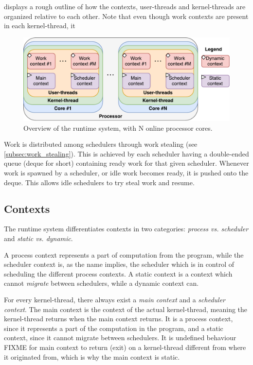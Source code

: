 displays a rough outline of how the contexts, user\hyp{}threads and kernel\hyp{}threads are organized relative to each other. Note that even though work contexts are present in each kernel\hyp{}thread, it 

\begin{figure}[h!]
    \centering
    \includegraphics[width=0.8\linewidth]{fig/runtime_overview}
    \caption{Overview of the runtime system, with N online processor cores.}
    \label{fig:runtime_overview}
\end{figure}

Work is distributed among schedulers through work stealing (see \cref{subsec:work_stealing}). This is achieved by each scheduler having a double\hyp{}ended queue (deque for short) containing ready work for that given scheduler. Whenever work is spawned by a scheduler, or idle work becomes ready, it is pushed onto the deque. This allows idle schedulers to try steal work and resume.


\FloatBarrier
\subsection{Contexts}
\label{subsec:contexts}

The runtime system differentiates contexts in two categories: \textit{process vs. scheduler} and \textit{static vs. dynamic}.

A process context represents a part of computation from the program, while the scheduler context is, as the name implies, the scheduler which is in control of scheduling the different process contexts. A static context is a context which cannot \textit{migrate} between schedulers, while a dynamic context can.

For every kernel\hyp{}thread, there always exist a \textit{main context} and a \textit{scheduler context}. The main context is the context of the actual kernel\hyp{}thread, meaning the kernel\hyp{}thread returns when the main context returns. It is a process context, since it represents a part of the computation in the program, and a static context, since it cannot migrate between schedulers. It is undefined behaviour FIXME for main context to return (exit) on a kernel\hyp{}thread different from where it originated from, which is why the main context is static.

